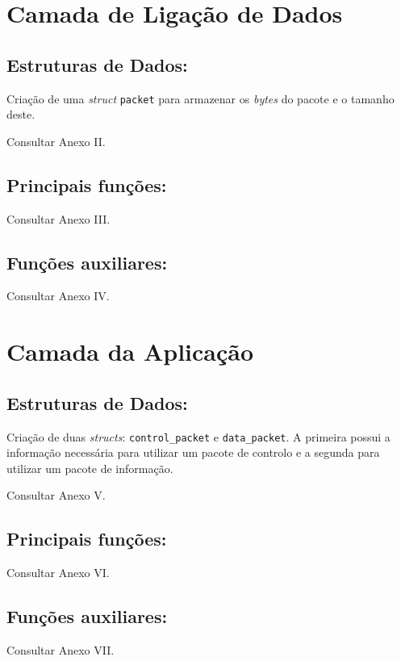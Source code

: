 \documentclass[article, a4paper, 11pt, oneside]{memoir}
\begin{document}
\section{Camada de Ligação de Dados}

\subsection{Estruturas de Dados:}
Criação de uma \textit{struct} \verb|packet| para armazenar os \textit{bytes} do pacote e o
tamanho deste.

Consultar Anexo II.

\subsection{Principais funções:}
Consultar Anexo III.

\subsection{Funções auxiliares:}
Consultar Anexo IV.

\section{Camada da Aplicação}

\subsection{Estruturas de Dados:}
Criação de duas \textit{structs}: \verb|control_packet| e \verb|data_packet|.
A primeira possui a informação necessária para utilizar um pacote de controlo e
a segunda para utilizar um pacote de informação.

Consultar Anexo V.

\subsection{Principais funções:}
Consultar Anexo VI.

\subsection{Funções auxiliares:}
Consultar Anexo VII.

\end{document}
